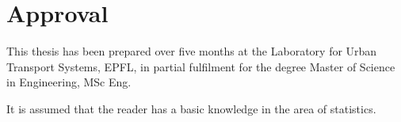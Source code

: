 \section*{Approval}
This thesis has been prepared over five months at the Laboratory for Urban Transport Systems, EPFL, in partial fulfilment for the degree Master of Science in Engineering, MSc Eng. 

It is assumed that the reader has a basic knowledge in the area of statistics. 

\vfill

\begin{center}
\namesigdate{\thesisauthor~-~\studentnumber}
\end{center}

\vfill



